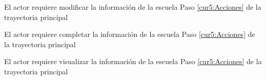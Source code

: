 \UCExtensionPoint
{El actor requiere modificar la información de la escuela}
{ Paso \ref{cur5:Acciones} de la trayectoria principal}
{}

\UCExtensionPoint
{El actor requiere completar la información de la escuela}
{ Paso \ref{cur5:Acciones} de la trayectoria principal}
{}
 
\UCExtensionPoint
{El actor requiere visualizar la información de la escuela}
{ Paso \ref{cur5:Acciones} de la trayectoria principal}
{}
